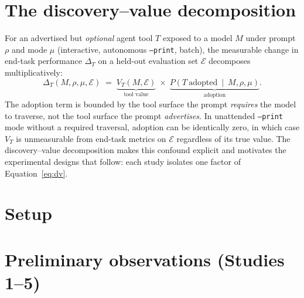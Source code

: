 \documentclass[letterpaper]{article}
\begin{document}
\section{The discovery--value decomposition}

For an advertised but \emph{optional} agent tool $T$ exposed to a
model $M$ under prompt $\rho$ and mode $\mu$ (interactive, autonomous
\texttt{--print}, batch), the measurable change in end-task
performance $\Delta_{T}$ on a held-out evaluation set $\mathcal{E}$
decomposes multiplicatively:
\begin{equation}
\label{eq:dv}
\Delta_{T}(M, \rho, \mu, \mathcal{E})
\;=\;
\underbrace{V_{T}(M, \mathcal{E})}_{\text{tool value}}
\;\times\;
\underbrace{P\!\left(T\ \text{adopted}\ \mid\ M, \rho, \mu\right)}_{\text{adoption}}.
\end{equation}
The adoption term is bounded by the tool surface the prompt
\emph{requires} the model to traverse, not the tool surface the prompt
\emph{advertises}. In unattended \texttt{--print} mode without a
required traversal, adoption can be identically zero, in which case
$V_{T}$ is unmeasurable from end-task metrics on $\mathcal{E}$
regardless of its true value. The discovery--value decomposition
makes this confound explicit and motivates the experimental designs
that follow: each study isolates one factor of
Equation~\ref{eq:dv}.

\section{Setup}

\section{Preliminary observations (Studies 1--5)}
\end{document}

